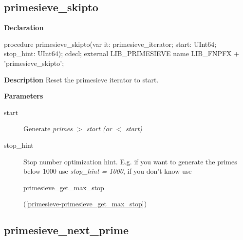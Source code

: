 \documentclass{report}
\newif\ifpdf
\begin{document}
\subsection*{primesieve{\_}skipto}
\fi
\label{primesieve-primesieve_skipto}
\begin{list}{}{
\setlength{\itemindent}{0cm}
\setlength{\listparindent}{0cm}
\setlength{\leftmargin}{\evensidemargin}
\addtolength{\leftmargin}{\tmplength}
\settowidth{\labelsep}{X}
\addtolength{\leftmargin}{\labelsep}
\setlength{\labelwidth}{\tmplength}
}
\item[\textbf{Declaration}\hfill]
\ifpdf
\begin{flushleft}
\fi
\begin{ttfamily}
procedure primesieve{\_}skipto(var it: primesieve{\_}iterator; start: UInt64; stop{\_}hint: UInt64); cdecl; external LIB{\_}PRIMESIEVE name LIB{\_}FNPFX + 'primesieve{\_}skipto';\end{ttfamily}

\ifpdf
\end{flushleft}
\fi

\par
\item[\textbf{Description}]
Reset the primesieve iterator to start.



\par
\item[\textbf{Parameters}]
\begin{description}
\item[start] Generate \textit{primes {$>$} start (or {$<$} start)}
\item[stop{\_}hint] Stop number optimization hint. E.g. if you want to generate the primes below 1000 use \textit{stop{\_}hint = 1000}, if you don't know use \begin{ttfamily}primesieve{\_}get{\_}max{\_}stop\end{ttfamily}(\ref{primesieve-primesieve_get_max_stop})
\end{description}


\end{list}
\ifpdf
\subsection*{\large{\textbf{primesieve{\_}next{\_}prime}}\normalsize\hspace{1ex}\hrulefill}
\else
\end{document}
